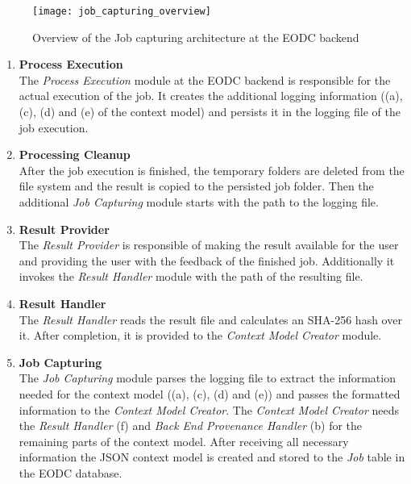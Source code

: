 \documentclass[draft,final]{vutinfth} %
\begin{document}
\begin{figure}[h]
	\centering
	\texttt{[image: job\_capturing\_overview]}
	\caption{Overview of the Job capturing architecture at the EODC backend}
	\label{fig:impljobcapture} %
\end{figure}

\begin{enumerate}
	\item \textbf{Process Execution} \\
	The \textit{Process Execution} module at the EODC backend is responsible for the actual execution of the job. It creates the additional logging information ((a), (c), (d) and (e) of the context model) and persists it in the logging file of the job execution. 
	\item \textbf{Processing Cleanup} \\
	After the job execution is finished, the temporary folders are deleted from the file system and the result is copied to the persisted job folder. Then the additional \textit{Job Capturing} module starts with the path to the logging file.  
	\item \textbf{Result Provider} \\
	The \textit{Result Provider} is responsible of making the result available for the user and providing the user with the feedback of the finished job. Additionally it invokes the \textit{Result Handler} module with the path of the resulting file.
	\item \textbf{Result Handler} \\
	The \textit{Result Handler} reads the result file and calculates an SHA-256 hash over it. After completion, it is provided to the \textit{Context Model Creator} module.  
	\item \textbf{Job Capturing} \\
	The \textit{Job Capturing} module parses the logging file to extract the information needed for the context model ((a), (c), (d) and (e)) and passes the formatted information to the \textit{Context Model Creator}. The \textit{Context Model Creator} needs the \textit{Result Handler} (f) and \textit{Back End Provenance Handler} (b) for the remaining parts of the context model. After receiving all necessary information the JSON context model is created and stored to the \textit{Job} table in the EODC database.    
\end{enumerate}
\end{document}
